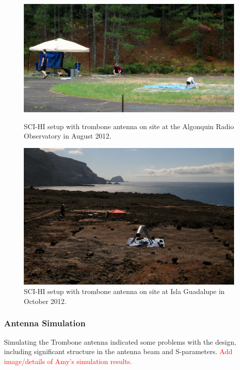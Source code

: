 \begin{figure}[htb]
\centering
\begin{minipage}[b]{0.52\textwidth}
\centering
\includegraphics[width=0.95\linewidth]{SCIHI_system/figures/trombone_alg_sys.jpg}
\caption{SCI-HI setup with trombone antenna on site at the Algonquin Radio Observatory in August 2012.}
\label{Fig:trombone_alg}
\end{minipage}%
\begin{minipage}[b]{0.02\textwidth}
\hspace{1cm}
\end{minipage}%
\begin{minipage}[b]{0.42\textwidth}
\centering
\includegraphics[width=0.95\linewidth]{SCIHI_system/figures/trombone_sys_guad.jpg}
\caption{SCI-HI setup with trombone antenna on site at Isla Guadalupe in October 2012.}
\label{Fig:trombone_guad}
\end{minipage}
\end{figure}

\subsubsection{Antenna Simulation}
Simulating the Trombone antenna indicated some problems with the design, including significant structure in the antenna beam and S-parameters. \textcolor{red}{Add image/details of Amy's simulation results.}

